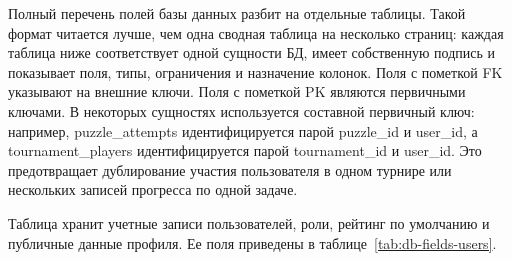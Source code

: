 Полный перечень полей базы данных разбит на отдельные таблицы. Такой формат читается лучше, чем одна сводная таблица на несколько страниц: каждая таблица ниже соответствует одной сущности БД, имеет собственную подпись и показывает поля, типы, ограничения и назначение колонок. Поля с пометкой FK указывают на внешние ключи. Поля с пометкой PK являются первичными ключами. В некоторых сущностях используется составной первичный ключ: например, puzzle\_attempts идентифицируется парой puzzle\_id и user\_id, а tournament\_players идентифицируется парой tournament\_id и user\_id. Это предотвращает дублирование участия пользователя в одном турнире или нескольких записей прогресса по одной задаче.

Таблица  хранит учетные записи пользователей, роли, рейтинг по умолчанию и публичные данные профиля. Ее поля приведены в таблице~\ref{tab:db-fields-users}.

